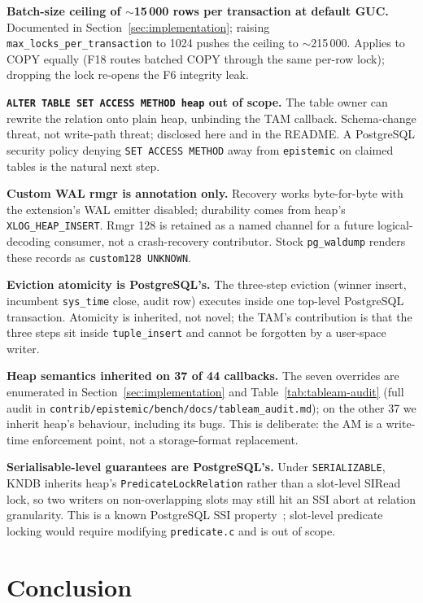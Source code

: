 \documentclass[sigconf, nonacm]{acmart}
\begin{document}
\textbf{Batch-size ceiling of $\sim$15\,000 rows per transaction at default GUC.} Documented in Section~\ref{sec:implementation}; raising \texttt{max\_locks\_per\_transaction} to 1024 pushes the ceiling to $\sim$215\,000. Applies to COPY equally (F18 routes batched COPY through the same per-row lock); dropping the lock re-opens the F6 integrity leak.

\textbf{\texttt{ALTER TABLE SET ACCESS METHOD heap} out of scope.} The table owner can rewrite the relation onto plain heap, unbinding the TAM callback. Schema-change threat, not write-path threat; disclosed here and in the README. A PostgreSQL security policy denying \texttt{SET ACCESS METHOD} away from \texttt{epistemic} on claimed tables is the natural next step.

\textbf{Custom WAL rmgr is annotation only.} Recovery works byte-for-byte with the extension's WAL emitter disabled; durability comes from heap's \texttt{XLOG\_HEAP\_INSERT}. Rmgr 128 is retained as a named channel for a future logical-decoding consumer, not a crash-recovery contributor. Stock \texttt{pg\_waldump} renders these records as \texttt{custom128 UNKNOWN}.

\textbf{Eviction atomicity is PostgreSQL's.} The three-step eviction (winner insert, incumbent \texttt{sys\_time} close, audit row) executes inside one top-level PostgreSQL transaction. Atomicity is inherited, not novel; the TAM's contribution is that the three steps sit inside \texttt{tuple\_insert} and cannot be forgotten by a user-space writer.

\textbf{Heap semantics inherited on 37 of 44 callbacks.} The seven overrides are enumerated in Section~\ref{sec:implementation} and Table~\ref{tab:tableam-audit} (full audit in \texttt{contrib/epistemic/bench/docs/tableam\_audit.md}); on the other 37 we inherit heap's behaviour, including its bugs. This is deliberate: the AM is a write-time enforcement point, not a storage-format replacement.

\textbf{Serialisable-level guarantees are PostgreSQL's.} Under \texttt{SERIALIZABLE}, KNDB inherits heap's \texttt{PredicateLockRelation} rather than a slot-level SIRead lock, so two writers on non-overlapping slots may still hit an SSI abort at relation granularity. This is a known PostgreSQL SSI property~\cite{ports2012ssi}; slot-level predicate locking would require modifying \texttt{predicate.c} and is out of scope.

\section{Conclusion}
\end{document}
